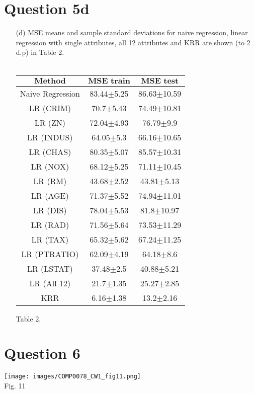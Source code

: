 \documentclass[a4paper,12pt]{article}
\begin{document}
\section*{Question 5d}
\begin{enumerate}

\item[(d)] 
MSE means and sample standard deviations for naive regression, linear regression with single attributes, all 12 attributes and KRR are shown (to 2 d.p) in Table 2.\\\\
\begin{tabular}{|c|c|c|}
\hline
$\textbf{Method}$&$\textbf{MSE train}$&$\textbf{MSE test}$\\
\hline
Naive Regression&83.44$\pm$5.25&86.63$\pm$10.59\\ \hline
LR (CRIM)&70.7$\pm$5.43&74.49$\pm$10.81\\ \hline
LR (ZN)&72.04$\pm$4.93&76.79$\pm$9.9\\ \hline
LR (INDUS)&64.05$\pm$5.3&66.16$\pm$10.65\\ \hline
LR (CHAS)&80.35$\pm$5.07&85.57$\pm$10.31\\ \hline
LR (NOX)&68.12$\pm$5.25&71.11$\pm$10.45\\ \hline
LR (RM)&43.68$\pm$2.52&43.81$\pm$5.13\\ \hline
LR (AGE)&71.37$\pm$5.52&74.94$\pm$11.01\\ \hline
LR (DIS)&78.04$\pm$5.53&81.8$\pm$10.97\\ \hline
LR (RAD)&71.56$\pm$5.64&73.53$\pm$11.29\\ \hline
LR (TAX)&65.32$\pm$5.62&67.24$\pm$11.25\\ \hline
LR (PTRATIO)&62.09$\pm$4.19&64.18$\pm$8.6\\ \hline
LR (LSTAT)&37.48$\pm$2.5&40.88$\pm$5.21\\ \hline
LR (All 12)&21.7$\pm$1.35&25.27$\pm$2.85\\ \hline
KRR&6.16$\pm$1.38&13.2$\pm$2.16\\
\hline
\end{tabular}\par 
Table 2.

\end{enumerate}
\clearpage
\section*{Question 6}

\texttt{[image: images/COMP0078\_CW1\_fig11.png]}\\
Fig. 11\\
\end{document}

